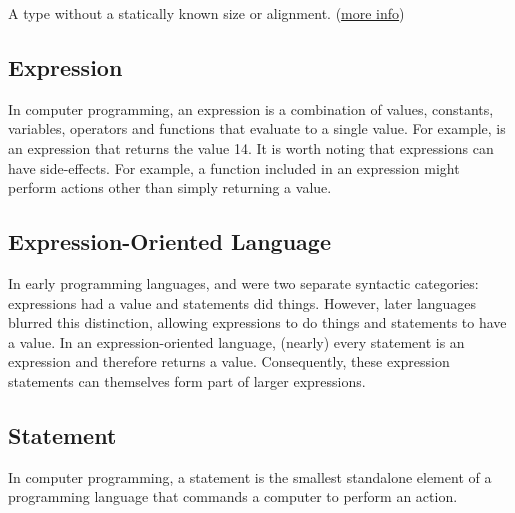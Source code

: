 A type without a statically known size or alignment. (\href{https://doc.rust-lang.org/nomicon/exotic-sizes.html#dynamically-sized-types-dsts}{more info})

\subsection*{Expression}
\label{sec:gloss_expression}

In computer programming, an expression is a combination of values, constants, variables, operators and functions that 
evaluate to a single value. For example,  is an expression that returns the value 14. It is worth 
noting that expressions can have side-effects. For example, a function included in an expression might perform actions 
other than simply returning a value.

\subsection*{Expression-Oriented Language}
\label{sec:gloss_expressionorientedlang}

In early programming languages,  and  were two separate syntactic categories: 
expressions had a value and statements did things. However, later languages blurred this distinction, allowing expressions to do things 
and statements to have a value. In an expression-oriented language, (nearly) every statement is an expression and therefore returns a value.
 Consequently, these expression statements can themselves form part of larger expressions.

\subsection*{Statement}
\label{sec:gloss_statements}

In computer programming, a statement is the smallest standalone element of a programming language that commands a computer to perform 
an action.
